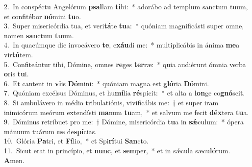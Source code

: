 {2.~}In conspéctu Angelórum \textbf{psal}lam \textbf{ti}bi:~* adorábo ad templum sanctum tuum, et confitébor \textbf{nó}mini \textbf{tu}o.\\
{3.~}Super misericórdia tua, et veri\textbf{tá}te \textbf{tu}a:~* quóniam magnificásti super omne, nomen \textbf{san}ctum \textbf{tu}um.\\
{4.~}In quacúmque die invocávero \textbf{te}, e\textbf{xáu}di me:~* multiplicábis in ánima \textbf{me}a vir\textbf{tú}tem.\\
{5.~}Confiteántur tibi, Dómine, omnes \textbf{re}ges \textbf{ter}ræ:~* quia audiérunt ómnia verba \textbf{o}ris \textbf{tu}i.\\
{6.~}Et cantent in \textbf{vi}is \textbf{Dó}mini:~* quóniam magna est \textbf{gló}ria \textbf{Dó}mini.\\
{7.~}Quóniam excélsus Dóminus, et hu\textbf{mí}lia \textbf{ré}spicit:~* et alta a \textbf{lon}ge co\textbf{gnó}scit.\\
{8.~}Si ambulávero in médio tribulatiónis, vivificábis me:~† et super iram inimicórum meórum extendísti \textbf{ma}num \textbf{tu}am,~* et salvum me fecit \textbf{déx}tera \textbf{tu}a.\\
{9.~}Dóminus retríbuet pro me:~† Dómine, misericórdia \textbf{tu}a in \textbf{sǽ}culum:~* ópera mánuum tuárum \textbf{ne} de\textbf{spí}cias.\\
{10.~}Glória \textbf{Pa}tri, et \textbf{Fí}lio,~* et Spi\textbf{rí}tui \textbf{San}cto.\\
{11.~}Sicut erat in princípio, et \textbf{nunc}, et \textbf{sem}per,~* et in sǽcula sæcu\textbf{ló}rum. \textbf{A}men.\\
